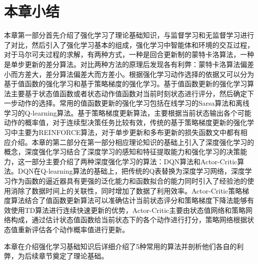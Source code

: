 \section{本章小结}
本章第一部分首先介绍了强化学习了理论基础知识，与监督学习和无监督学习进行了对比，然后引入了强化学习基本的组成，强化学习中智能体和环境的交互过程，对于马尔可夫过程的求解，有两种方式，一种是回合更新制的蒙特卡洛算法，一种是单步更新的差分算法。对比两种方法的原理后发现各有利弊：蒙特卡洛算法偏差小而方差大，差分算法偏差大而方差小。根据强化学习动作选择的依据又可以分为基于值函数的强化学习和基于策略梯度的强化学习。基于值函数更新的强化学习算法主要基于状态值函数或者状态动作值函数对当前时刻状态进行评分，然后确定下一步动作的选择。常用的值函数更新的强化学习包括在线学习的Sarsa算法和离线学习的Q-learning算法。基于策略梯度更新算法，主要根据当前状态输出各个可能动作的概率值，对于连续型决策任务比较有效，传统的基于策略梯度更新的强化学习中主要为REINFORCE算法，对于单步更新和多布更新的损失函数文中都有相应介绍。本章的第二部分在第一部分相应理论知识的基础上引入了深度强化学习的概念，深度强化学习结合了深度学习的感知和特征提取能力和强化学习的决策能力，这一部分主要介绍了两种深度强化学习的算法：DQN算法和Actor-Critic算法。DQN在Q-learning算法的基础上，把传统的Q表替换为深度学习网络，深度学习作为函数的逼近器具有更强的泛化能力和函数拟合的能力同时引入了经验池的使用消除了数据时间上的关联性，同时增加了数据了利用效率。Actor-Critic策略梯度算法结合了值函数更新算法可以准确估计当前状态评分和策略梯度下降法能够有效使用TD算法进行连续快速更新的优势，Actor-Critic主要由状态值网络和策略网络构成，通过估计状态值函数给当前状态下的各个动作进行打分，策略网络根据状态值重新评估各个动作概率值进行更新。

本章在介绍强化学习基础知识后详细介绍了5种常用的算法并剖析他们各自的利弊，为后续章节奠定了理论基础。
